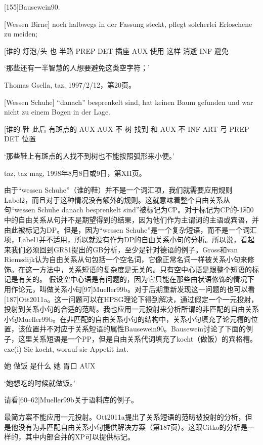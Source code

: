  [155]Bausewein90. 


[Wessen      Birne]    noch halbwegs in der Fassung steckt, pflegt solcherlei Erloschene zu meiden;

       [谁的 灯泡/头 也  半路  PREP DET 插座  AUX      使用  这样      消逝    INF 避免

`那些还有一半智慧的人想要避免这类空字符；'



Thomas Gsella, taz, 1997/2/12，第20页。



[Wessen Schuhe] "`danach"'  besprenkelt sind, hat keinen Baum gefunden und war nicht zu einem Bogen in der Lage.

       [谁的    鞋   此后 有斑点的    AUX   AUX 不     树 找到    和 AUX 不   INF ART     弓   PREP DET 位置

`那些鞋上有斑点的人找不到树也不能按照弧形来小便。'



        taz, taz mag, 1998年8月8日或9日，第XII页。  

      


由于“wessen Schuhe”（谁的鞋）并不是一个词汇项，我们就需要应用规则Label2，而且对于这种情况没有额外的规则。这就意味着整个自由关系从句“wessen Schuhe danach besprenkelt sind”被标记为CP。对于标记为CP的-1和0中的自由关系从句并不是期望得到的结果，因为他们作为主谓词的主语或宾语，并由此被标记为DP。但是，因为“wessen Schuhe”是一个复杂短语，而不是一个词汇项，Label1并不适用，所以就没有作为DP的自由关系小句的分析。所以说，看起来我们必须回到GR81提出的GB分析，至少是针对德语的例子。Gross和van Riemsdijk认为自由关系从句包括一个空名词，它像正常名词一样被关系小句来修饰。在这一方法中，关系短语的复杂度是无关的。只有空中心语是跟整个短语的标记是有关的。 
假设空中心语是有问题的，因为它只能在那些由状语修饰的情况下用作论元，叫做关系小句[97]Mueller99b。对于后期重新发现这一问题的也可以看[187]Ott2011a。这一问题可以在HPSG理论下得到解决，通过假定一个一元投射，投射到关系小句的合适的范畴。我也应用一元投射来分析所谓的非匹配的自由关系小句Mueller99b。在非匹配的自由关系小句的结构中，关系小句填充了论元槽的位置，该位置并不对应于关系短语的属性Bausewein90。Bausewein讨论了下面的例子，这里关系短语是一个PP，但是自由关系代词填充了kocht（做饭）的宾格槽。
exe(i)
  Sie kocht, worauf   sie Appetit hat.

       她 做饭  是什么 她 胃口 AUX

  `她想吃的时候就做饭。'
  
请看[60--62]Mueller99b关于语料库的例子。

最简方案不能应用一元投射。Ott2011a提出了关系短语的范畴被投射的分析，但是他没有为非匹配自由关系小句提供解决方案（第187页）。这跟Citko的分析是一样的，其中内部合并的XP可以提供标记。


